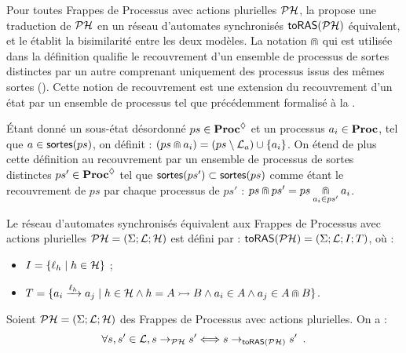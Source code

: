Pour toutes Frappes de Processus avec actions plurielles $\PH$,
la  propose une traduction de $\PH$
en un réseau d'automates synchronisés $\phmtoan[\PH]$ équivalent,
et le  établit la bisimilarité entre les deux modèles.
La notation $\recouvre$ qui est utilisée dans la définition
qualifie le recouvrement d'un ensemble de processus de sortes distinctes
par un autre comprenant uniquement des processus issus des mêmes sortes
().
Cette notion de recouvrement est une extension
du recouvrement d'un état par un ensemble de processus
tel que précédemment formalisé à la .

\begin{definition}
  Étant donné un sous-état désordonné $ps \in \PHsublset$ et un processus $a_i \in \Proc$,
  tel que $a \in \sortes{ps}$, on définit :
  $(ps \recouvre a_i) = (ps \setminus \PHl_a) \cup \{ a_i \}$.
  On étend de plus cette définition
  au recouvrement par un ensemble de processus de sortes distinctes
  $ps' \in \PHsublset$ tel que $\sortes{ps'} \subset \sortes{ps}$
  comme étant le recouvrement de $ps$ par chaque processus de $ps'$ :
  $ps \recouvre ps' = ps \underset{a_i \in ps'}{\recouvre} a_i$.
\end{definition}

\begin{definition}
  Le réseau d'automates synchronisés équivalent aux Frappes de Processus
  avec actions plurielles $\PH = (\PHs; \PHl; \PHh)$
  est défini par : $\phmtoan = (\PHs; \PHl; \ANi; \ANt)$, où :
  \begin{itemize}
    \item $\ANi = \{ \ell_h \mid h \in \PHh \}$ ; %
    \item $\ANt = \{ \ANaction{a_i}{\ell_h}{a_j} \mid
      h \in \PHh \wedge h = \PHfrappemult{A}{B} \wedge a_i \in A \wedge a_j \in A \recouvre B \}$.
  \end{itemize}
\end{definition}

\begin{theorem}[$\PH \approx \phmtoan$]
  Soient $\PH = (\PHs; \PHl; \PHh)$ des Frappes de Processus avec actions plurielles.
  On a :
  \[\forall s, s' \in \PHl, s \PHtrans s' \Longleftrightarrow s \trans{\phmtoan} s' \enspace.\]
\end{theorem}

